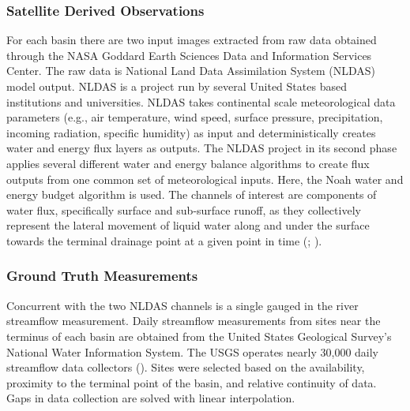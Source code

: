 \begin{refsection}
\subsubsection{Satellite Derived Observations}
For each basin there are two input images extracted from raw data obtained through the NASA Goddard Earth Sciences Data and Information Services Center. The raw data is National Land Data Assimilation System (NLDAS) model output. NLDAS is a project run by several United States based institutions and universities. NLDAS takes continental scale meteorological data parameters (e.g., air temperature, wind speed, surface pressure, precipitation, incoming radiation, specific humidity) as input and deterministically creates water and energy flux layers as outputs. The NLDAS project in its second phase applies several different water and energy balance algorithms to create flux outputs from one common set of meteorological inputs. Here, the Noah water and energy budget algorithm is used. The channels of interest are components of water flux, specifically surface and sub-surface runoff, as they collectively represent the lateral movement of liquid water along and under the surface towards the terminal drainage point at a given point in time (\cite{xia2012continental}; \cite{liang1994simple}).

\subsubsection{Ground Truth Measurements}
Concurrent with the two NLDAS channels is a single gauged in the river streamflow measurement. Daily streamflow measurements from sites near the terminus of each basin are obtained from the United States Geological Survey’s National Water Information System. The USGS operates nearly 30,000 daily streamflow data collectors (\cite{edwards1986conceptual}). Sites were selected based on the availability, proximity to the terminal point of the basin, and relative continuity of data. Gaps in data collection are solved with linear interpolation. 


\end{refsection}
